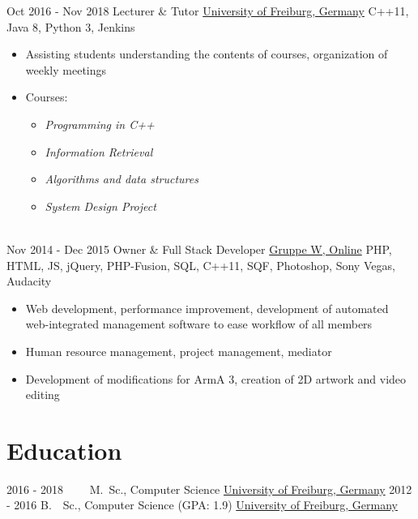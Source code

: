 \documentclass[letterpaper]{twentysecondcv} %
\begin{document}
\vspace{10mm}
\begin{twenty} %
     	\twentyitem
    		{Oct 2016 -}
		{Nov 2018}
        		{Lecturer \& Tutor}
        		{\href{https://www.uni-freiburg.de/}{University of Freiburg, Germany}}
        		{C++11, Java 8, Python 3, Jenkins}
        		{\begin{itemize}
        			\item Assisting students understanding the contents of courses, organization of weekly meetings
        			\item Courses:
        			\begin{itemize}
        				\item \textit{Programming in C++}
        				\item \textit{Information Retrieval}
        				\item \textit{Algorithms and data structures}
        				\item \textit{System Design Project}
        			\end{itemize}
        		\end{itemize}}\\
	\twentyitem
    		{Nov 2014 -}
		{Dec 2015}
        		{Owner \& Full Stack Developer}
        		{\href{https://www.gruppe-w.de/}{Gruppe W, Online}}
        		{PHP, HTML, JS, jQuery, PHP-Fusion, SQL, C++11, SQF, Photoshop, Sony Vegas, Audacity}
        		{\begin{itemize}
        			\item Web development, performance improvement, development of automated web-integrated
        				management software to ease workflow of all members
			\item Human resource management, project management, mediator
        			\item Development of modifications for ArmA 3, creation of 2D artwork and video editing
        		\end{itemize}}
\end{twenty}

\section{Education}

\begin{twenty} %
	\twentyitem
    	{2016 - 2018~~~~}
        {}
        {M.~Sc., Computer Science}
        {\href{https://www.uni-freiburg.de/}{University of Freiburg, Germany}}
        {}
        {}
	\twentyitem
    	{2012 - 2016}
		{}
        {B.~~Sc., Computer Science \textnormal{(GPA: 1.9)}}
        {\href{https://www.uni-freiburg.de/}{University of Freiburg, Germany}}
        {}
        {}
\end{twenty}
\end{document}
